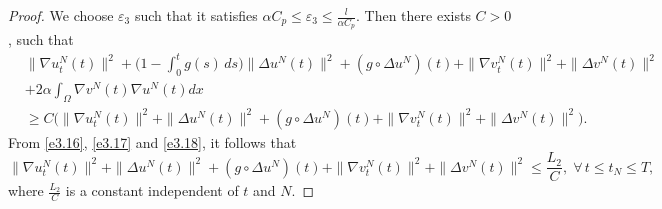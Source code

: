 \documentclass[10pt,a4paper]{amsart}
\numberwithin{equation}{section}
\begin{document}
\begin{proof}
We choose $\varepsilon_{3}$ such that it satisfies
$\alpha C_p \leq \varepsilon_{3}\leq \frac{l}{\alpha C_p}$.
Then there exists $C>0$, such that
\begin{equation}
\begin{aligned}
&\| \nabla u^N_{t}(t) \|^2+\Big( 1 - \int_0^t g(s)\,ds \Big) \| \Delta u^N(t) \|^2
+ (g \circ \Delta u^N)(t) + \| \nabla v^N_{t}(t) \|^2+ \| \Delta v^N(t) \|^2\\
&+2 \alpha \int_{\Omega} \nabla v^N (t)\nabla u^N (t) dx \\
&\geq C \Big( \| \nabla u^N_{t}(t) \|^2+ \| \Delta u^N (t)\|^2
+ (g \circ \Delta u^N)(t) + \| \nabla v^N_{t}(t) \|^2
+ \| \Delta v^N (t)\|^2 \Big).
\end{aligned} \label{e3.18}
\end{equation}
From \eqref{e3.16}, \eqref{e3.17} and \eqref{e3.18}, it follows that
\begin{equation}
\| \nabla u^N_{t}(t) \|^2+ \| \Delta u^N(t) \|^2 + (g \circ \Delta u^N)(t)
+ \| \nabla v^N_{t}(t) \|^2+ \| \Delta v^N(t) \|^2
\leq \frac{L_2}{C}, \; \forall\, t\leq t_{N} \leq T,\label{e3.19}
 \end{equation}
where $\frac{L_2}{C}$ is a constant independent of $t$ and $N$.
\smallskip


\end{proof}
\end{document}

